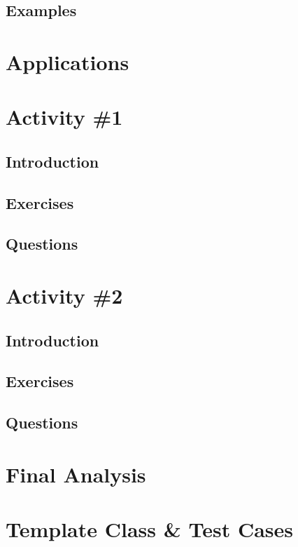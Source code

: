 		\subsection{Examples}

	\pagebreak

	\section{Applications}

	\pagebreak

	\section{Activity \#1}
		\subsection{Introduction}
		\subsection{Exercises}
		\subsection{Questions}

	\pagebreak

	\section{Activity \#2}
		\subsection{Introduction}
		\subsection{Exercises}
		\subsection{Questions}

	\pagebreak

	\section{Final Analysis}

	\pagebreak
	\blankpage
	\pagebreak

	\section{Template Class \& Test Cases}


